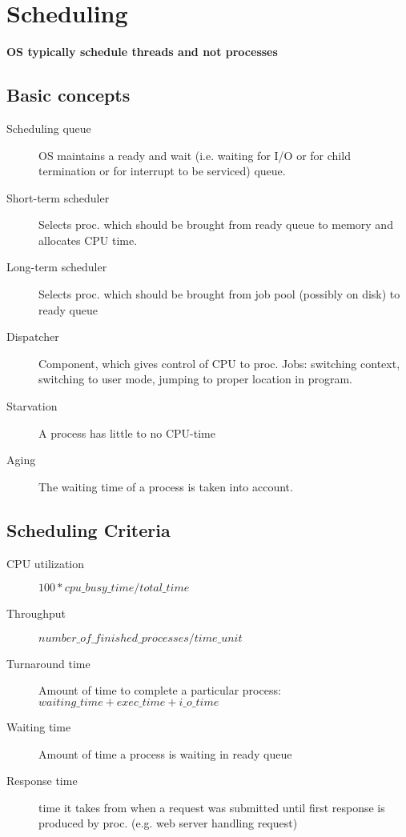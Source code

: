 \section*{Scheduling}
\textbf{OS typically schedule threads and not processes}

\subsection*{Basic concepts}
\begin{description}
  \item[Scheduling queue] OS maintains a ready and wait (i.e. waiting for I/O or for child termination or for interrupt to be serviced) queue.
  \item[Short-term scheduler] Selects proc. which should be brought from ready queue to memory and allocates CPU time. 
  \item[Long-term scheduler] Selects proc. which should be brought from job pool (possibly on disk) to ready queue
  \item[Dispatcher] Component, which gives control of CPU to proc. Jobs: switching context, switching to user mode, jumping to proper location in program.
  \item[Starvation] A process has little to no CPU-time
  \item[Aging] The waiting time of a process is taken into account.
\end{description}

\subsection*{Scheduling Criteria}
\begin{description}
  \item[CPU utilization] $100 * cpu\_busy\_time / total\_time$
  \item[Throughput] $number\_of\_finished\_processes/time\_unit$
  \item[Turnaround time] Amount of time to complete a particular process: $waiting\_time+exec\_time+i\_o\_time$
  \item[Waiting time] Amount of time a process is waiting in ready queue
  \item[Response time] time it takes from when a request was submitted until first response is produced by proc. (e.g. web server handling request)
\end{description}

